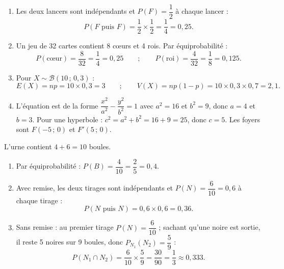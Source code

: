 \documentclass[11pt]{article}
\begin{document}
\begin{corrige}
\begin{enumerate}
\item Les deux lancers sont indépendants et $P(F)=\dfrac12$ à chaque lancer :
\[P(F\text{ puis }F)=\dfrac12\times\dfrac12=\dfrac14=0,25.\]
\item Un jeu de 32 cartes contient 8 cœurs et 4 rois. Par équiprobabilité :
\[P(\text{cœur})=\dfrac{8}{32}=\dfrac14=0,25 \qquad ; \qquad P(\text{roi})=\dfrac{4}{32}=\dfrac18=0,125.\]
\item Pour $X\sim\mathcal{B}(10\,;\,0,3)$ :
\[E(X)=np=10\times 0,3=3 \qquad ; \qquad V(X)=np(1-p)=10\times0,3\times0,7=2,1.\]
\item L'équation est de la forme $\dfrac{x^2}{a^2}-\dfrac{y^2}{b^2}=1$ avec $a^2=16$ et $b^2=9$, donc $a=4$ et $b=3$. Pour une hyperbole : $c^2=a^2+b^2=16+9=25$, donc $c=5$. Les foyers sont $F(-5\,;\,0)$ et $F'(5\,;\,0)$.
\end{enumerate}
\end{corrige}

\begin{corrige}
L'urne contient $4+6=10$ boules.
\begin{enumerate}
\item Par équiprobabilité : $P(B)=\dfrac{4}{10}=\dfrac25=0,4$.
\item Avec remise, les deux tirages sont indépendants et $P(N)=\dfrac{6}{10}=0,6$ à chaque tirage :
\[P(N\text{ puis }N)=0,6\times0,6=0,36.\]
\item Sans remise : au premier tirage $P(N)=\dfrac{6}{10}$ ; sachant qu'une noire est sortie, il reste 5 noires sur 9 boules, donc $P_{N_1}(N_2)=\dfrac59$ :
\[P(N_1\cap N_2)=\dfrac{6}{10}\times\dfrac59=\dfrac{30}{90}=\dfrac13\approx0,333.\]
\end{enumerate}
\end{corrige}
\end{document}

